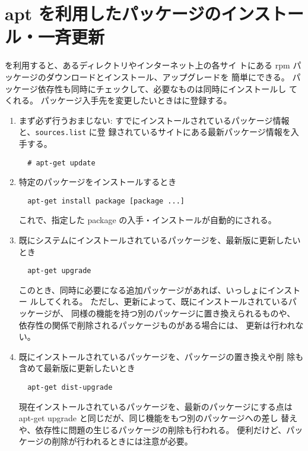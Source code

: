 \documentclass{jreport}
\begin{document}
\section{apt を利用したパッケージのインストール・一斉更新\label{sec:apt}}

 を利用すると、あるディレクトリやインターネット上の各サイ
トにある rpm パッケージのダウンロードとインストール、アップグレードを
簡単にできる。
パッケージ依存性も同時にチェックして、必要なものは同時にインストールし
てくれる。
パッケージ入手先を変更したいときはに登録する。
\begin{enumerate}
\item まず必ず行うおまじない:
すでにインストールされているパッケージ情報と、\verb|sources.list| に登
録されているサイトにある最新パッケージ情報を入手する。
\begin{screen}
\begin{verbatim}
  # apt-get update
\end{verbatim}
\end{screen}

\item  特定のパッケージをインストールするとき
\begin{screen}
\begin{verbatim}
  apt-get install package [package ...]
\end{verbatim}
\end{screen}

これで、指定した package の入手・インストールが自動的にされる。

\item  既にシステムにインストールされているパッケージを、最新版に更新したいとき
\begin{screen}
\begin{verbatim}
  apt-get upgrade
\end{verbatim}
\end{screen}

このとき、同時に必要になる追加パッケージがあれば、いっしょにインストー
ルしてくれる。
ただし、更新によって、既にインストールされているパッケージが、
同様の機能を持つ別のパッケージに置き換えられるものや、
依存性の関係で削除されるパッケージものがある場合には、
更新は行われない。

\item 既にインストールされているパッケージを、パッケージの置き換えや削
  除も含めて最新版に更新したいとき
\begin{screen}
\begin{verbatim}
  apt-get dist-upgrade
\end{verbatim}
\end{screen}
現在インストールされているパッケージを、最新のパッケージにする点は
apt-get upgrade と同じだが、同じ機能をもつ別のパッケージへの差し
替えや、依存性に問題の生じるパッケージの削除も行われる。
便利だけど、パッケージの削除が行われるときには注意が必要。
\end{enumerate}
\end{document}
